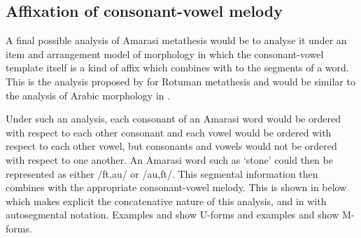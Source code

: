 \subsection{Affixation of consonant-vowel melody}\label{sec:AffCVMel}
A final possible analysis of Amarasi metathesis
would be to analyse it under an item and arrangement model of morphology
in which the consonant-vowel template itself is a kind of affix
which combines with to the segments of a word.
This is the analysis proposed by \citet[160f]{st94} for Rotuman metathesis
and would be similar to the analysis of Arabic morphology in \cite{mcc81}.

Under such an analysis,
each consonant of an Amarasi word would be ordered with respect to each other consonant
and each vowel would be ordered with respect to each other vowel,
but consonants and vowels would not be ordered with respect to one another.
An Amarasi word such as  `stone'
could then be represented as  either /ft,au/ or /au,ft/.
This segmental information then combines with the appropriate consonant-vowel melody.
This is shown in  below
which makes explicit the concatenative nature of this analysis,
and in  with autosegmental notation.
Examples  and  show U-forms
and examples  and  show M-forms.

\begin{multicols}{2}
	\begin{exe}
		\label{ex:fatu/faut}
	\end{exe}
\end{multicols}
\begin{multicols}{2}
	\begin{exe}
		\label{as:fatu/faut}
	\end{exe}
\end{multicols}

